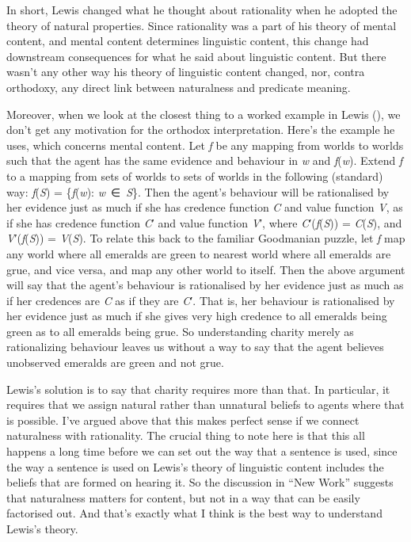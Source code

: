 \documentclass[
  11pt,
  letterpaper,
  DIV=11,
  numbers=noendperiod,
  twoside]{scrartcl}
\begin{document}
In short, Lewis changed what he thought about rationality when he
adopted the theory of natural properties. Since rationality was a part
of his theory of mental content, and mental content determines
linguistic content, this change had downstream consequences for what he
said about linguistic content. But there wasn't any other way his theory
of linguistic content changed, nor, contra orthodoxy, any direct link
between naturalness and predicate meaning.

Moreover, when we look at the closest thing to a worked example in Lewis
(), we don't get any motivation for the
orthodox interpretation. Here's the example he uses, which concerns
mental content. Let \emph{f} be any mapping from worlds to worlds such
that the agent has the same evidence and behaviour in \emph{w} and
\emph{f}(\emph{w}). Extend \emph{f} to a mapping from sets of worlds to
sets of worlds in the following (standard) way: \emph{f}(\emph{S}) =
\{\emph{f}(\emph{w}): \emph{w}~∈~\emph{S}\}. Then the agent's behaviour
will be rationalised by her evidence just as much if she has credence
function \emph{C} and value function \emph{V}, as if she has credence
function \emph{C}′ and value function \emph{V}′, where
\emph{C}′(\emph{f}(\emph{S})) = \emph{C}(\emph{S}), and
\emph{V}′(\emph{f}(\emph{S})) = \emph{V}(\emph{S}). To relate this back
to the familiar Goodmanian puzzle, let \emph{f} map any world where all
emeralds are green to nearest world where all emeralds are grue, and
vice versa, and map any other world to itself. Then the above argument
will say that the agent's behaviour is rationalised by her evidence just
as much as if her credences are \emph{C} as if they are \emph{C}′. That
is, her behaviour is rationalised by her evidence just as much if she
gives very high credence to all emeralds being green as to all emeralds
being grue. So understanding charity merely as rationalizing behaviour
leaves us without a way to say that the agent believes unobserved
emeralds are green and not grue.

Lewis's solution is to say that charity requires more than that. In
particular, it requires that we assign natural rather than unnatural
beliefs to agents where that is possible. I've argued above that this
makes perfect sense if we connect naturalness with rationality. The
crucial thing to note here is that this all happens a long time before
we can set out the way that a sentence is used, since the way a sentence
is used on Lewis's theory of linguistic content includes the beliefs
that are formed on hearing it. So the discussion in ``New Work''
suggests that naturalness matters for content, but not in a way that can
be easily factorised out. And that's exactly what I think is the best
way to understand Lewis's theory.
\end{document}
